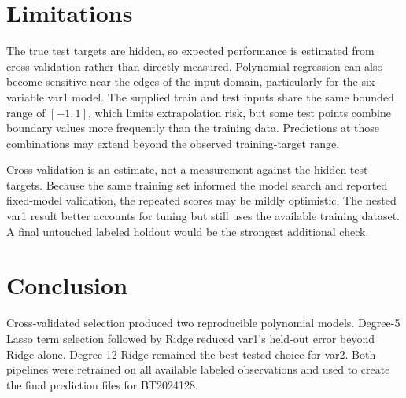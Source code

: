 \documentclass[10pt,a4paper]{article}
\begin{document}
\section{Limitations}
The true test targets are hidden, so expected performance is estimated from cross-validation rather than directly measured. Polynomial regression can also become sensitive near the edges of the input domain, particularly for the six-variable var1 model. The supplied train and test inputs share the same bounded range of $[-1,1]$, which limits extrapolation risk, but some test points combine boundary values more frequently than the training data. Predictions at those combinations may extend beyond the observed training-target range.

Cross-validation is an estimate, not a measurement against the hidden test targets. Because the same training set informed the model search and reported fixed-model validation, the repeated scores may be mildly optimistic. The nested var1 result better accounts for tuning but still uses the available training dataset. A final untouched labeled holdout would be the strongest additional check.

\section{Conclusion}
Cross-validated selection produced two reproducible polynomial models. Degree-5 Lasso term selection followed by Ridge reduced var1's held-out error beyond Ridge alone. Degree-12 Ridge remained the best tested choice for var2. Both pipelines were retrained on all available labeled observations and used to create the final prediction files for BT2024128.
\end{document}
